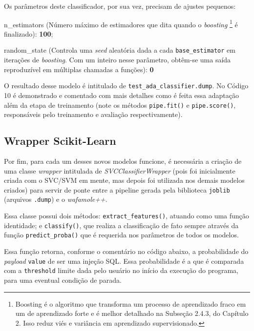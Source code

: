 Os parâmetros deste classificador, por sua vez, precisam de ajustes pequenos:
\begin{alineas}
\item n\_estimators (Número máximo de estimadores que dita quando o \textit{boosting} \footnote{Boosting é o algoritmo que transforma um processo de aprendizado fraco em um de aprendizado forte e é melhor detalhado na Subseção 2.4.3, do Capítulo 2. Isso reduz viés e variância em aprendizado supervisionado.} é finalizado): \textbf{100};
\item random\_state (Controla uma \textit{seed} aleatória dada a cada \verb+base_estimator+ em iterações de \textit{boosting}. Com um inteiro nesse parâmetro, obtêm-se uma saída reproduzível em múltiplas chamadas a funções): \textbf{0}
\end{alineas}


O resultado desse modelo é intitulado de \verb+test_ada_classifier.dump+. No Código 10 é demonstrado e comentado com mais detalhes como é feita essa adaptação além da etapa de treinamento (note os métodos \verb+pipe.fit()+ e \verb+pipe.score()+, responsáveis pelo treinamento e avaliação respectivamente).

\label{sec:codigos:modelos}
\bigskip

\subsection{Wrapper Scikit-Learn}
Por fim, para cada um desses novos modelos funcione, é necessária a criação de uma classe \textit{wrapper} intitulada de \textit{SVCClassifierWrapper} (pois foi inicialmente criada com o SVC/SVM em mente, mas depois foi utilizada nos demais modelos criados) para servir de ponte entre a pipeline gerada pela biblioteca \verb+joblib+ (arquivos \verb+.dump+) e o \textit{wafamole++}. 

Essa classe possui dois métodos: \verb+extract_features()+, atuando como uma função identidade; e \verb+classify()+, que realiza a classificação de fato sempre através da função \verb+predict_proba()+ que é requerida nos parâmetros de todos os modelos. 

Essa função retorna, conforme o comentário no código abaixo, a probabilidade do \textit{payload} \verb+value+ de ser uma injeção SQL. Essa probabilidade é a que é comparada com a \verb+threshold+ limite dada pelo usuário no início da execução do programa, para uma eventual condição de parada. 

